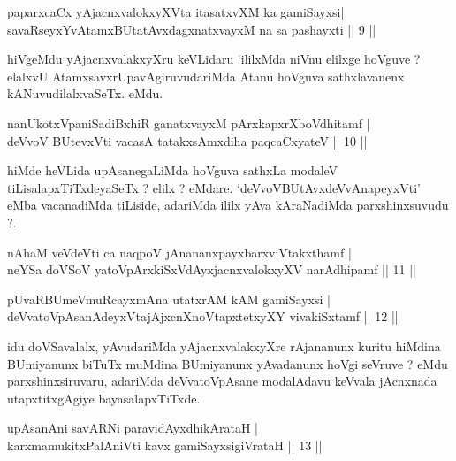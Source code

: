 \begin{shl}
paparxcaCx yAjacnxvalokxyXV\s ta itasatxvXM ka gamiSayxsi|\\
savaRseyxYvA\s \s tamxBUtatAvxdagxnatxvayxM na sa pashayxti \hfill || 9 || 
\end{shl}

\begin{artha}
hiVgeMdu yAjacnxvalakxyXru keVLidaru `ililxMda niVnu elilxge hoVguve ? elalxvU AtamxsavxrUpavAgiruvudariMda Atanu hoVguva sathxlavanenx kANuvudilalxvaSeTx. eMdu.
\end{artha}


\begin{shl}
nanUkotxVpaniSadiBxhiR ganatxvayxM pArxkapxrXboVdhitamf |\\
deVvoV BUtevxVti vacasA tatakxsAmxdiha paqcaCxyateV \hfill || 10 || 
\end{shl}

\begin{artha}
hiMde heVLida upAsanegaLiMda hoVguva sathxLa modaleV tiLisalapxTiTxdeyaSeTx ? elilx ? eMdare. `deVvoVBUtAvxdeVvAnapeyxVti' eMba vacanadiMda tiLiside, adariMda ililx yAva kAraNadiMda parxshinxsuvudu ?.
\end{artha}


\begin{shl}
nAhaM veVdeVti ca naqpoV jAnananxpayxbarxviVtakxthamf |\\
neYSa doVSoV yatoV\s pArxkiSxVdAyxjacnxvalokxyXV narAdhipamf \hfill || 11 || 
\end{shl}

\begin{shl}
pUvaRBUmeVmuRcayxmAna utatxrAM kAM gamiSayxsi |\\
deVvatoVpAsanAdeyxVtajAjxcnXnoVtapxtetxyXY vivakiSxtamf \hfill || 12 || 
\end{shl}

\begin{artha}
idu doVSavalalx, yAvudariMda yAjacnxvalakxyXre rAjananunx kuritu hiMdina BUmiyanunx biTuTx muMdina BUmiyanunx yAvadanunx hoVgi seVruve ? eMdu parxshinxsiruvaru, adariMda deVvatoVpAsane modalAdavu keVvala jAcnxnada utapxtitxgAgiye bayasalapxTiTxde.
\end{artha}

\begin{shl}
upAsanAni savARNi paravidAyxdhikArataH |\\
karxmamukitxPalAniVti kavx gamiSayxsigiVrataH \hfill || 13 || 
\end{shl}

